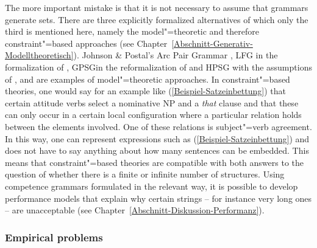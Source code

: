 The more important mistake is that it is not necessary to assume that grammars generate
sets. There are three explicitly formalized alternatives of which only the third is mentioned here,
namely the model"=theoretic and therefore constraint"=based approaches (see 
Chapter~\ref{Abschnitt-Generativ-Modelltheoretisch}). Johnson \& Postal's Arc Pair Grammar \citeyearpar{JP80a-u}, LFG\indexlfg
in the formalization of \citet{Kaplan95a}, GPSG\indexgpsg in the reformalization of \citet{Rogers97a} and HPSG\indexhpsg
with the assumptions of \citet{King99a-u}, \citet{Pollard99a} and \citet{Richter2007a} are examples of model"=theoretic approaches.
In constraint"=based theories, one would say for an example like (\ref{Beispiel-Satzeinbettung}) that certain attitude verbs select a nominative NP and a 
\emph{that} clause and that these can only occur in a certain local configuration where a particular relation holds between the elements involved.
One of these relations is subject"=verb agreement. In this way, one can represent expressions such as (\ref{Beispiel-Satzeinbettung})
and does not have to say anything about how many sentences can be embedded.
This means that constraint"=based theories are compatible with both answers to the question of whether there is a finite or infinite number of structures.
Using competence grammars formulated in the relevant way, it is possible to develop performance
models that explain why certain strings -- for instance very long ones -- are unacceptable
(see Chapter~\ref{Abschnitt-Diskussion-Performanz}).

\subsubsection{Empirical problems}

